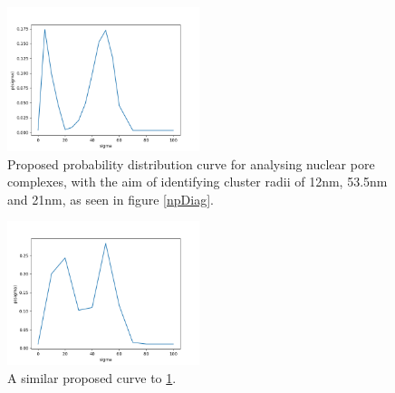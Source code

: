 \documentclass[11pt]{article}
\begin{document}
\begin{figure} 
	
	\centering
	\includegraphics[width=0.5\textwidth]{figs/OneDipSigma.png}
	\caption{Proposed probability distribution curve for analysing nuclear pore complexes, with the aim of identifying cluster radii of 12nm, 53.5nm and 21nm, as seen in figure \ref{npDiag}.}
	\label{onePeakSigma}
\end{figure}
\begin{figure} 
	
	\centering
	\includegraphics[width=0.5\textwidth]{figs/threeDipSigma.png}
	\caption{A similar proposed curve to \ref{onePeakSigma}.}
	\label{}
\end{figure}
\end{document}
